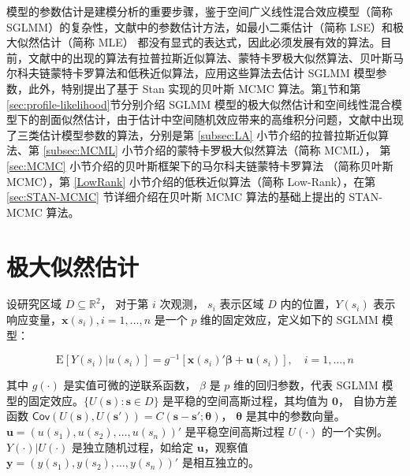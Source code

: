 \documentclass[12pt,a4paper,UTF8,twoside]{book}
\theoremstyle{definition}
\theoremstyle{definition}
\theoremstyle{definition}
\theoremstyle{remark}
\begin{document}
模型的参数估计是建模分析的重要步骤，鉴于空间广义线性混合效应模型（简称
SGLMM）的复杂性，文献中的参数估计方法，如最小二乘估计（简称
LSE）和极大似然估计（简称 MLE）
都没有显式的表达式，因此必须发展有效的算法。目前，文献中的出现的算法有拉普拉斯近似算法、蒙特卡罗极大似然算法、贝叶斯马尔科夫链蒙特卡罗算法和低秩近似算法，应用这些算法去估计
SGLMM 模型参数，此外，特别提出了基于 Stan 实现的贝叶斯 MCMC
算法。第\ref{sec:mle}节和第\ref{sec:profile-likelihood}节分别介绍 SGLMM
模型的极大似然估计和空间线性混合模型下的剖面似然估计，由于估计中空间随机效应带来的高维积分问题，文献中出现了三类估计模型参数的算法，分别是第
\ref{subsec:LA} 小节介绍的拉普拉斯近似算法、第 \ref{subsec:MCML}
小节介绍的蒙特卡罗极大似然算法（简称 MCML）， 第 \ref{sec:MCMC}
小节介绍的贝叶斯框架下的马尔科夫链蒙特卡罗算法 （简称贝叶斯 MCMC），第
\ref{LowRank} 小节介绍的低秩近似算法（简称 Low-Rank），在第
\ref{sec:STAN-MCMC} 节详细介绍在贝叶斯 MCMC 算法的基础上提出的 STAN-MCMC
算法。

\hypertarget{sec:mle}{%
\section{极大似然估计}\label{sec:mle}}

设研究区域 \(D \subseteq \mathbb{R}^2\)， 对于第 \(i\) 次观测， \(s_i\)
表示区域 \(D\) 内的位置，\(Y(s_i)\)
表示响应变量，\(\mathbf{x}(s_i), i = 1, \ldots, n\) 是一个 \(p\)
维的固定效应，定义如下的 SGLMM 模型：

\[ \mathrm{E}[Y(s_i)|u(s_i)] = g^{-1}[\mathbf{x}(s_i)'\boldsymbol{\beta} + \mathbf{u}(s_i)], \quad i = 1, \ldots, n \]

\noindent 其中 \(g(\cdot)\) 是实值可微的逆联系函数， \(\beta\) 是 \(p\)
维的回归参数，代表 SGLMM
模型的固定效应。\(\{U(\mathbf{s}): \mathbf{s} \in D\}\)
是平稳的空间高斯过程，其均值为 \(\mathbf{0}\)， 自协方差函数
\(\mathsf{Cov}(U(\mathbf{s}),U(\mathbf{s}')) = C(\mathbf{s} - \mathbf{s}'; \boldsymbol{\theta})\)，
\(\boldsymbol{\theta}\) 是其中的参数向量。
\(\mathbf{u} = (u(s_1),u(s_2),\ldots,u(s_n))'\) 是平稳空间高斯过程
\(U(\cdot)\) 的一个实例。\(Y(\cdot)|U(\cdot)\) 是独立随机过程，如给定
\(\mathbf{u}\)，观察值 \(\mathbf{y} = (y(s_1),y(s_2),\ldots,y(s_n))'\)
是相互独立的。
\end{document}
